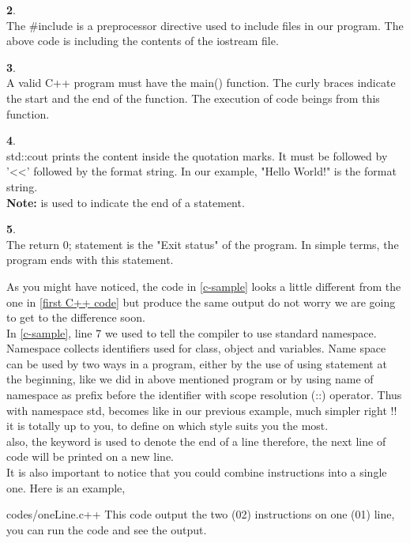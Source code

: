 \documentclass[11pt, a4paper]{article}
\begin{document}
\noindent
\textbf{2}. \\
The \#include is a preprocessor directive used to include files in our
program. The above code is including the contents of the iostream file.

\noindent
\textbf{3}. \\
A valid C++ program must have the main() function. The curly braces
indicate the start and the end of the function. The execution of
code beings from this function.

\noindent
\textbf{4}. \\
std::cout prints the content inside the quotation marks.
It must be followed by '\textless\textless'  followed by the format string.
In our example, "Hello World!" is the format string. \\
\textbf{Note: } \fbox{;} is used to indicate the end of a statement.

\noindent
\textbf{5}. \\
The return 0; statement is the "Exit status" of the program.
In simple terms, the program ends with this statement.

As you might have noticed, the code in \ref{c-sample} looks a little different from the one
in \ref{first C++ code} but produce the same output do not worry we are going to get to the
difference soon. \\
\noindent In \ref{c-sample}, line 7 we used 
to tell the compiler to use standard namespace. Namespace collects identifiers used for class, object
and variables. Name space can be used by two ways in a program, either by the use of using statement
at the beginning, like we did in above mentioned program or by using name of namespace as prefix
before the identifier with scope resolution (::) operator. Thus with namespace std,
becomes 
like in our previous example, much simpler right !! it is totally up to you, to define on which style
suits you the most.\\
\noindent  also, the keyword  is used to denote the end of a line therefore, the next line
of code will be printed on a new line.\\
It is also important to notice that you could combine instructions into a single one. Here is an example,

{codes/oneLine.c++}
This code output the two (02) instructions on one (01) line, you can run the code and see the output.
\end{document}
